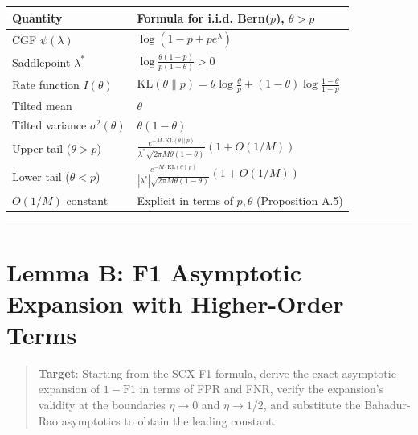 \documentclass[
  12pt,
]{article}
\begin{document}
\begin{longtable}[]{@{}
  >{\raggedright\arraybackslash}p{}
  >{\raggedright\arraybackslash}p{}@{}}
\toprule\noalign{}
\begin{minipage}[b]{\linewidth}\raggedright
Quantity
\end{minipage} & \begin{minipage}[b]{\linewidth}\raggedright
Formula for i.i.d. Bern(\(p\)), \(\theta > p\)
\end{minipage} \\
\midrule\noalign{}
\endhead
\bottomrule\noalign{}
\endlastfoot
CGF \(\psi(\lambda)\) & \(\log(1-p+pe^\lambda)\) \\
Saddlepoint \(\lambda^*\) &
\(\log\frac{\theta(1-p)}{p(1-\theta)} > 0\) \\
Rate function \(I(\theta)\) &
\(\text{KL}(\theta\|p) = \theta\log\frac{\theta}{p} + (1-\theta)\log\frac{1-\theta}{1-p}\) \\
Tilted mean & \(\theta\) \\
Tilted variance \(\sigma^2(\theta)\) & \(\theta(1-\theta)\) \\
Upper tail (\(\theta > p\)) &
\(\displaystyle \frac{e^{-M\cdot\text{KL}(\theta\|p)}} {\lambda^*\sqrt{2\pi M\theta(1-\theta)}} (1+O(1/M))\) \\
Lower tail (\(\theta < p\)) &
\(\displaystyle \frac{e^{-M\cdot\text{KL}(\theta\|p)}} {|\lambda^*|\sqrt{2\pi M\theta(1-\theta)}} (1+O(1/M))\) \\
\(O(1/M)\) constant & Explicit in terms of \(p,\theta\) (Proposition
A.5) \\
\end{longtable}

\begin{center}\rule{0.5\linewidth}{0.5pt}\end{center}

\section{Lemma B: F1 Asymptotic Expansion with Higher-Order
Terms}\label{lemma-b-f1-asymptotic-expansion-with-higher-order-terms}

\begin{quote}
\textbf{Target}: Starting from the SCX F1 formula, derive the exact
asymptotic expansion of \(1-\text{F1}\) in terms of FPR and FNR, verify
the expansion's validity at the boundaries \(\eta \to 0\) and
\(\eta \to 1/2\), and substitute the Bahadur-Rao asymptotics to obtain
the leading constant.
\end{quote}
\end{document}
